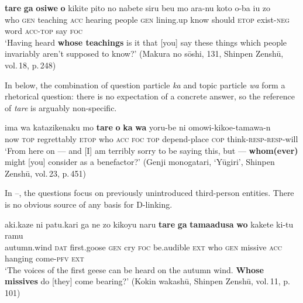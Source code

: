 \documentclass[output=paper]{LSP/langsci}
\begin{document}
\begin{exe}
\ex%
\label{07-fr-ex:38}
\gll \textbf{tare} \textbf{ga} \textbf{osiwe} \textbf{o} kikite pito no nabete siru beu mo ara-nu koto o-ba iu zo\\
who \textsc{gen} teaching \textsc{acc} hearing people \textsc{gen} lining.up know should \textsc{etop} exist-\textsc{neg} word \textsc{acc}-\textsc{top} say \textsc{foc}\\
\glt ‘Having heard \textbf{whose teachings} is it that [you] say these things which people invariably aren’t supposed to know?’ (Makura no sōshi, 131, Shinpen Zenshū, vol.\,18, p.\,248)
\end{exe}

In  below, the combination of question particle \textit{ka} and topic particle \textit{wa} form a rhetorical question: there is no expectation of a concrete answer, so the reference of \textit{tare} is arguably non-specific. 


\begin{exe}
\ex%
\label{07-fr-ex:39}
\gll ima wa katazikenaku mo \textbf{tare} \textbf{o} \textbf{ka} \textbf{wa} yoru-be ni omowi-kikoe-tamawa-n\\
now \textsc{top} regrettably \textsc{etop}  who \textsc{acc} \textsc{foc} \textsc{top}  depend-place \textsc{cop} think-\textsc{resp}-\textsc{resp}-will\\
\glt ‘From here on — and [I] am terribly sorry to be saying this, but — \textbf{whom(ever)} might [you] consider as a benefactor?’  (Genji monogatari, ‘Yūgiri’, Shinpen Zenshū, vol.\,23, p.\,451)
\end{exe}

In --, the questions focus on previously unintroduced third-person entities. There is no obvious source of any basis for D-linking. 

\begin{exe}
\ex%
\label{07-fr-ex:40}
\gll aki.kaze ni patu.kari ga ne zo kikoyu naru \textbf{tare} \textbf{ga} \textbf{tamaadusa} \textbf{wo} kakete ki-tu ramu\\
autumn.wind \textsc{dat} first.goose \textsc{gen} cry \textsc{foc} be.audible \textsc{ext}  who \textsc{gen} missive \textsc{acc}   hanging come-\textsc{pfv} \textsc{ext}\\
\glt ‘The voices of the first geese can be heard on the autumn wind. \textbf{Whose missives} do [they] come bearing?’ (Kokin wakashū, Shinpen Zenshū, vol.\,11, p.\,101)
\end{exe}
\end{document}
